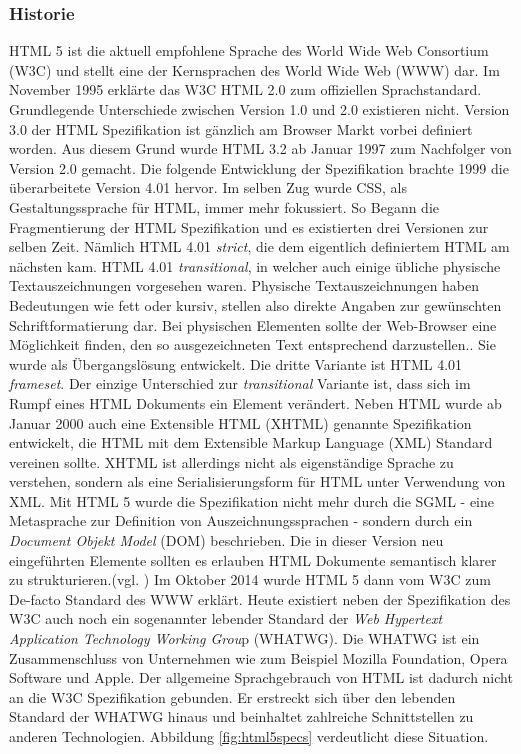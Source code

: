 \subsubsection{Historie} HTML 5 ist die aktuell empfohlene Sprache des World Wide Web Consortium (W3C) und stellt eine der Kernsprachen des World Wide Web (WWW) dar. Im November 1995 erklärte das W3C HTML 2.0 zum offiziellen Sprachstandard. Grundlegende Unterschiede zwischen Version 1.0 und 2.0 existieren nicht. Version 3.0 der HTML Spezifikation ist gänzlich am Browser Markt vorbei definiert worden. Aus diesem Grund wurde HTML 3.2 ab Januar 1997 zum Nachfolger von Version 2.0 gemacht. Die folgende Entwicklung der Spezifikation brachte 1999 die überarbeitete Version 4.01 hervor. Im selben Zug wurde CSS, als Gestaltungssprache für HTML, immer mehr fokussiert. So Begann die Fragmentierung der HTML Spezifikation und es existierten drei Versionen zur selben Zeit. Nämlich HTML 4.01 \textit{strict}, die dem eigentlich definiertem HTML am nächsten kam. HTML 4.01 \textit{transitional}, in welcher auch einige übliche physische Textauszeichnungen vorgesehen waren. \glqq Physische Textauszeichnungen haben Bedeutungen wie \glqq fett\grqq{} oder \glqq kursiv\grqq{}, stellen also direkte Angaben zur gewünschten Schriftformatierung dar. Bei physischen Elementen sollte der Web-Browser eine Möglichkeit finden, den so ausgezeichneten Text entsprechend darzustellen.\grqq{}\cite{SelfHTML20141}. Sie wurde als Übergangslösung entwickelt. Die dritte Variante ist HTML 4.01 \textit{frameset}. Der einzige Unterschied zur \textit{transitional} Variante ist, dass sich im Rumpf eines HTML Dokuments ein Element verändert. Neben HTML wurde ab Januar 2000 auch eine Extensible HTML (XHTML) genannte Spezifikation entwickelt, die HTML mit dem Extensible Markup Language (XML) Standard vereinen sollte. XHTML ist allerdings nicht als eigenständige Sprache zu verstehen, sondern als eine Serialisierungsform für HTML unter Verwendung von XML. Mit HTML 5 wurde die Spezifikation nicht mehr durch die SGML - eine Metasprache zur Definition von Auszeichnungssprachen - sondern durch ein \textit{Document Objekt Model} (DOM) beschrieben. Die in dieser Version neu eingeführten Elemente sollten es erlauben HTML Dokumente semantisch klarer zu strukturieren.(vgl. \cite[S.20ff]{MunzHTML2012}) Im Oktober 2014 wurde HTML 5 dann vom W3C zum De-facto Standard des WWW erklärt. Heute existiert neben der Spezifikation des W3C auch noch ein sogenannter \glqq lebender Standard\grqq{} der \textit{Web Hypertext Application Technology Working Grou}p (WHATWG). Die WHATWG ist ein Zusammenschluss von Unternehmen wie zum Beispiel Mozilla Foundation, Opera Software und Apple. Der allgemeine Sprachgebrauch von HTML ist dadurch nicht an die W3C Spezifikation gebunden. Er erstreckt sich über den \glqq lebenden Standard\grqq{} der WHATWG hinaus und beinhaltet zahlreiche Schnittstellen zu anderen Technologien. Abbildung \ref{fig:html5specs} verdeutlicht diese Situation.
	
